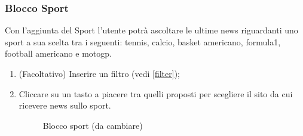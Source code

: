 \subsubsection{Blocco Sport}
Con l'aggiunta del Sport l'utente potrà ascoltare le ultime news riguardanti uno sport a sua scelta tra i seguenti: tennis, calcio, basket americano, formula1, football americano e motogp.
\begin{enumerate}
	\item (Facoltativo) Inserire un filtro (vedi \ref{filter});
	\item Cliccare su un tasto a piacere tra quelli proposti per scegliere il sito da cui ricevere news sullo sport.
	\begin{figure}[!ht]
		\centering
		\caption{Blocco sport (da cambiare)}
	\end{figure}
\end{enumerate}
\newpage
